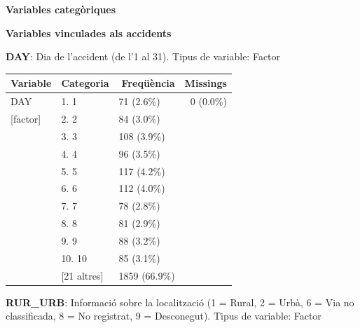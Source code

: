\documentclass[12pt,longbibliography]{article}
\theoremstyle{definition}
\theoremstyle{remark}
\begin{document}
\begin{large}

\textbf{Variables categòriques}

\end{large}

\textbf{Variables vinculades als accidents}



\textbf{DAY}: Dia de l’accident (de l’1 al 31). Tipus de variable: Factor

\begin{table}[H]
\centering
\begin{tabular}{lllr}
\hline
Variable     & \multicolumn{1}{r}{Categoria} & \multicolumn{1}{r}{Freqüència} & Missings  \\ \hline
DAY          & 1. 1                          & 71 (2.6\%)                     & 0 (0.0\%) \\
{[}factor{]} & 2. 2                          & 84 (3.0\%)                     &           \\
             & 3. 3                          & 108 (3.9\%)                    &           \\
             & 4. 4                          & 96 (3.5\%)                     &           \\
             & 5. 5                          & 117 (4.2\%)                    &           \\
             & 6. 6                          & 112 (4.0\%)                    &           \\
             & 7. 7                          & 78 (2.8\%)                     &           \\
             & 8. 8                          & 81 (2.9\%)                     &           \\
             & 9. 9                          & 88 (3.2\%)                     &           \\
             & 10. 10                        & 85 (3.1\%)                     &           \\
             & {[}21 altres{]}               & 1859 (66.9\%)                  &           \\ \hline
\end{tabular}
\end{table}


\textbf{RUR\_URB}: Informació sobre la localització (1 = Rural, 2 = Urbà, 6 = Via no classificada, 8 = No registrat, 9 = Desconegut). Tipus de variable: Factor
\end{document}
